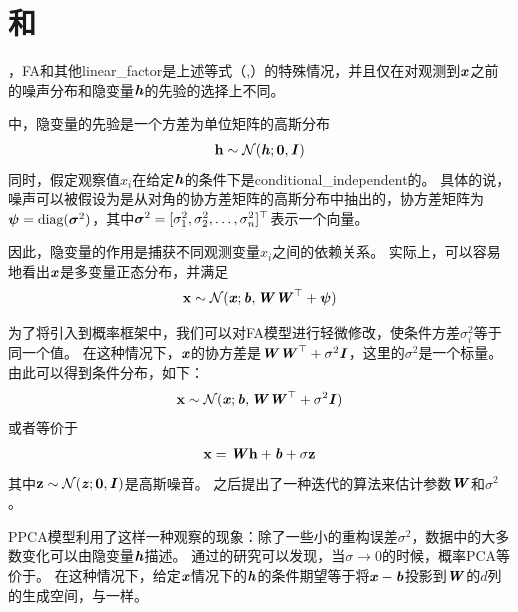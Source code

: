 \section{和}
\label{sec:probabilistic_PCA_and_factor_analysis}

，\gls{FA}和其他\gls{linear_factor}是上述等式（,）的特殊情况，并且仅在对观测到$\boldsymbol{\mathit{x}}$之前的噪声分布和隐变量$\boldsymbol{\mathit{h}}$的先验的选择上不同。

\citep{Bartholomew-1987,Basilevsky94}中，隐变量的先验是一个方差为单位矩阵的高斯分布
\begin{align}
\label{eqn:133}
\RVh \sim \CalN(\Vh; \mathbf{0},\MI)
\end{align}
同时，假定观察值$x_i$在给定$\boldsymbol{\mathit{h}}$的条件下是\gls{conditional_independent}的。
具体的说，噪声可以被假设为是从对角的协方差矩阵的高斯分布中抽出的，协方差矩阵为$\boldsymbol{\psi} = \text{diag}(\boldsymbol{\sigma}^2)$，其中$\boldsymbol{\sigma}^2 = [\sigma_1^2,\sigma_2^2,\ldots,\sigma_n^2]^{\top}$表示一个向量。


因此，隐变量的作用是捕获不同观测变量$x_i$之间的依赖关系。
实际上，可以容易地看出$\boldsymbol{\mathit{x}}$是多变量正态分布，并满足
\begin{align}
\label{eqn:134}
\RVx \sim \CalN(\Vx; \Vb, \MW\MW^{\top}+\Vpsi)
\end{align}



为了将引入到概率框架中，我们可以对\gls{FA}模型进行轻微修改，使条件方差$\sigma_i^2$等于同一个值。
在这种情况下，$\boldsymbol{\mathit{x}}$的协方差是$\boldsymbol{\mathit{W}}\boldsymbol{\mathit{W}}^{\top}+\sigma^2\boldsymbol{\mathit{I}}$，这里的$\sigma^2$是一个标量。
由此可以得到条件分布，如下：
\begin{align}
\label{eqn:135}
\RVx \sim \CalN(\Vx; \Vb, \MW\MW^{\top} + \sigma^2\MI )
\end{align}
或者等价于
\begin{align}
\label{eqn:136}
\RVx = \MW\RVh + \Vb + \sigma\RVz
\end{align}
其中$\mathbf{z} \sim \mathcal{N}(\boldsymbol{\mathit{z}};\mathbf{0},\boldsymbol{\mathit{I}})$是高斯噪音。
之后\citet{tipping99mixtures}提出了一种迭代的算法来估计参数$\boldsymbol{\mathit{W}}$和$\sigma^2$。


\gls{PPCA}模型利用了这样一种观察的现象：除了一些小的重构误差$\sigma^2$，数据中的大多数变化可以由隐变量$\boldsymbol{\mathit{h}}$描述。
通过\citet{tipping99mixtures}的研究可以发现，当$\sigma \xrightarrow{} 0$的时候，概率PCA等价于。
在这种情况下，给定$\boldsymbol{\mathit{x}}$情况下的$\boldsymbol{\mathit{h}}$的条件期望等于将$\boldsymbol{\mathit{x}} - \boldsymbol{\mathit{b}}$投影到$\boldsymbol{\mathit{W}}$的$d$列的生成空间，与一样。


